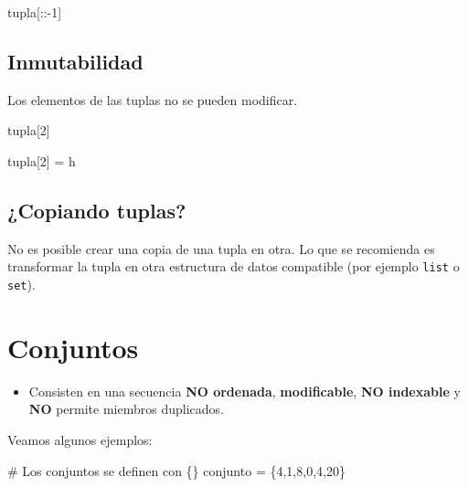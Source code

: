 \documentclass[
  letterpaper,
  DIV=11,
  numbers=noendperiod]{scrreprt}
\newenvironment{Shaded}{\begin{snugshade}}{\end{snugshade}}
\newcommand{\CommentTok}[1]{\textcolor[rgb]{0.37,0.37,0.37}{#1}}
\newcommand{\DecValTok}[1]{\textcolor[rgb]{0.68,0.00,0.00}{#1}}
\newcommand{\NormalTok}[1]{\textcolor[rgb]{0.00,0.23,0.31}{#1}}
\newcommand{\OperatorTok}[1]{\textcolor[rgb]{0.37,0.37,0.37}{#1}}
\newcommand{\StringTok}[1]{\textcolor[rgb]{0.13,0.47,0.30}{#1}}
\providecommand{\tightlist}{%
  \setlength{\itemsep}{0pt}\setlength{\parskip}{0pt}}\usepackage{longtable,booktabs,array}
\begin{document}
\begin{Shaded}
\begin{Highlighting}[]
\NormalTok{tupla[::}\OperatorTok{{-}}\DecValTok{1}\NormalTok{]}
\end{Highlighting}
\end{Shaded}

\section{Inmutabilidad}\label{inmutabilidad}

Los elementos de las tuplas no se pueden modificar.

\begin{Shaded}
\begin{Highlighting}[]
\NormalTok{tupla[}\DecValTok{2}\NormalTok{]}
\end{Highlighting}
\end{Shaded}

\begin{Shaded}
\begin{Highlighting}[]
\NormalTok{tupla[}\DecValTok{2}\NormalTok{] }\OperatorTok{=} \StringTok{\textquotesingle{}h\textquotesingle{}}
\end{Highlighting}
\end{Shaded}

\section{¿Copiando tuplas?}\label{copiando-tuplas}

No es posible crear una copia de una tupla en otra. Lo que se recomienda
es transformar la tupla en otra estructura de datos compatible (por
ejemplo \texttt{list} o \texttt{set}).


\chapter{Conjuntos}\label{conjuntos}

\begin{itemize}
\tightlist
\item
  Consisten en una secuencia \textbf{NO ordenada}, \textbf{modificable},
  \textbf{NO indexable} y \textbf{NO} permite miembros duplicados.
\end{itemize}

Veamos algunos ejemplos:

\begin{Shaded}
\begin{Highlighting}[]
\CommentTok{\# Los conjuntos se definen con \{\}}
\NormalTok{conjunto }\OperatorTok{=}\NormalTok{ \{}\DecValTok{4}\NormalTok{,}\DecValTok{1}\NormalTok{,}\DecValTok{8}\NormalTok{,}\DecValTok{0}\NormalTok{,}\DecValTok{4}\NormalTok{,}\DecValTok{20}\NormalTok{\}}
\end{Highlighting}
\end{Shaded}
\end{document}
